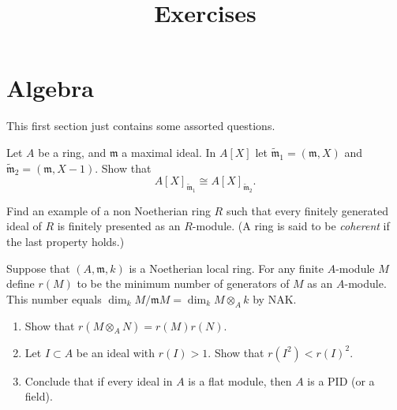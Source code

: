 

%


\title{Exercises}


\maketitle

\label{section-phantom}

\tableofcontents


\section{Algebra}
\label{section-algebra}

\noindent
This first section just contains some assorted questions.

\begin{exercise}
\label{exercise-isomorphism-localizations}
Let $A$ be a ring, and ${\mathfrak m}$ a maximal ideal. In $A[X]$
let $\tilde {\mathfrak m}_1 = ({\mathfrak m}, X)$ and
$\tilde {\mathfrak m}_2 = ({\mathfrak m}, X-1)$. Show
that
$$
A[X]_{\tilde {\mathfrak m}_1} \cong A[X]_{\tilde {\mathfrak m}_2}.
$$
\end{exercise}

\begin{exercise}
\label{exercise-coherent}
Find an example of a non Noetherian ring $R$ such that every
finitely generated ideal of $R$ is finitely presented as an $R$-module.
(A ring is said to be {\it coherent} if the last property holds.)
\end{exercise}

\begin{exercise}
\label{exercise-flat-ideals-pid}
Suppose that $(A, {\mathfrak m}, k)$ is a Noetherian local ring. For any
finite $A$-module $M$ define $r(M)$ to be the minimum number
of generators of $M$ as an $A$-module. This number equals
$\dim_k M/{\mathfrak m} M = \dim_k M\otimes_A k$ by NAK.
\begin{enumerate}
\item Show that $r(M\otimes_AN) = r(M)r(N)$.
\item Let $I\subset A $ be an ideal with $r(I)>1$. Show that
$r(I^2) < r(I)^2$.
\item Conclude that if every ideal in $A$ is a flat module, then
$A$ is a PID (or a field).
\end{enumerate}
\end{exercise}

